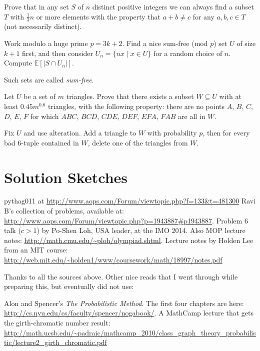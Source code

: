 \documentclass[11pt]{scrartcl}
\newcommand\EE{\mathbb E}
\begin{document}
\begin{problem}
  [Erd\"os] Prove that in any set $S$ of $n$ distinct positive integers
  we can always find a subset $T$ with $\frac 13n$ or more elements
  with the property that $a+b \neq c$ for any $a,b,c \in T$ (not necessarily distinct).
  \begin{sketch}
    Work modulo a huge prime $p=3k+2$.
    Find a nice sum-free (mod $p$) set $U$ of size $k+1$ first,
    and then consider $U_n = \{ nx \mid x \in U \}$ for a random choice of $n$.
    Compute $\EE[\left\lvert S \cap U_n \right\rvert]$.
  \end{sketch}
\end{problem}
\begin{remark*}
  Such sets are called \emph{sum-free}.
\end{remark*}

\begin{problem}
  [Korea 2016]
  Let $U$ be a set of $m$ triangles.
  Prove that there exists a subset $W \subseteq U$
  with at least $0.45 m^{0.8}$ triangles, with the following property:
  there are no points $A$, $B$, $C$, $D$, $E$, $F$
  for which $ABC$, $BCD$, $CDE$, $DEF$, $EFA$, $FAB$ are all in $W$.
  \begin{sketch}
    Fix $U$ and use alteration.
    Add a triangle to $W$ with probability $p$,
    then for every bad $6$-tuple contained in $W$,
    delete one of the triangles from $W$.
  \end{sketch}
\end{problem}

\section{Solution Sketches}


\begin{thebibliography}{99}
   pythag011 at \url{http://www.aops.com/Forum/viewtopic.php?f=133&t=481300}
   Ravi B's collection of problems, available at: \\ \url{http://www.aops.com/Forum/viewtopic.php?p=1943887#p1943887}.
   Problem 6 talk ($c>1$) by Po-Shen Loh, USA leader, at the IMO 2014.
   Also MOP lecture notes: \url{http://math.cmu.edu/~ploh/olympiad.shtml}.
   Lecture notes by Holden Lee from an MIT course: \\ \url{http://web.mit.edu/~holden1/www/coursework/math/18997/notes.pdf}
\end{thebibliography}
Thanks to all the sources above.
Other nice reads that I went through while preparing this, but eventually did not use:
\begin{enumerate}
  \ii Alon and Spencer's \emph{The Probabilistic Method}. The first four chapters are here: \url{http://cs.nyu.edu/cs/faculty/spencer/nogabook/}.
  \ii A MathCamp lecture that gets the girth-chromatic number result:
  \\ \small \url{http://math.ucsb.edu/~padraic/mathcamp_2010/class_graph_theory_probabilistic/lecture2_girth_chromatic.pdf}
\end{enumerate}
\end{document}
